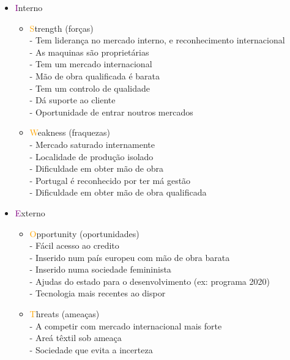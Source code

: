 \begin{itemize}
	\setlength\itemsep{-0.5em}
	\item \textcolor{purple}{I}nterno
	\begin{itemize}
		\setlength\itemsep{-0.3em}
		\item \textcolor{orange}{S}trength (forças)\\
		- Tem liderança no mercado interno, e reconhecimento internacional\\
		- As maquinas são proprietárias\\
		- Tem um mercado internacional\\
		- Mão de obra qualificada é barata\\
		- Tem um controlo de qualidade\\
		- Dá suporte ao cliente\\
		- Oportunidade de entrar noutros mercados
		\item \textcolor{orange}{W}eakness (fraquezas)\\
		- Mercado saturado internamente\\
		- Localidade de produção isolado\\
		- Dificuldade em obter mão de obra\\
		- Portugal é reconhecido por ter má gestão\\
		- Dificuldade em obter mão de obra qualificada\\
	\end{itemize}
	\item \textcolor{purple}{E}xterno
	\begin{itemize}
		\setlength\itemsep{-0.3em}
		\item \textcolor{orange}{O}pportunity (oportunidades)\\
		- Fácil acesso ao credito\\
		- Inserido num país europeu com mão de obra barata\\
		- Inserido numa sociedade femininista\\
		- Ajudas do estado para o desenvolvimento (ex: programa 2020)\\
		- Tecnologia mais recentes ao dispor\\
		\item \textcolor{orange}{T}hreats (ameaças)\\
		- A competir com mercado internacional mais forte\\
		- Areá têxtil sob ameaça\\
		- Sociedade que evita a incerteza
	\end{itemize}
\end{itemize}
